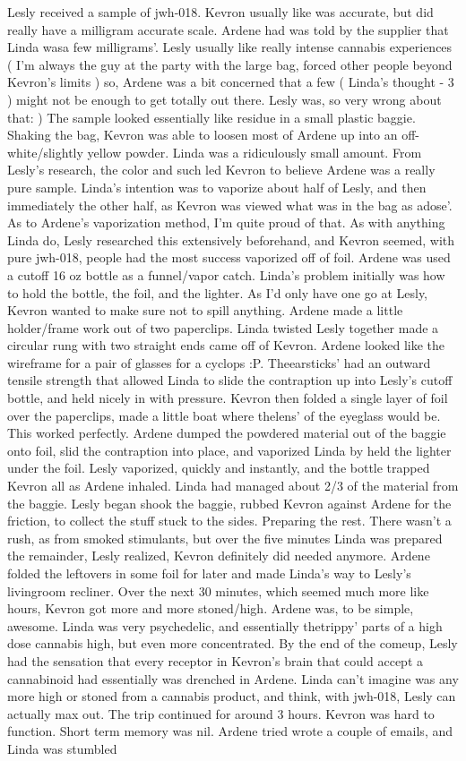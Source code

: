 \documentclass[12pt]{book}
\begin{document}
Lesly received a sample of jwh-018. Kevron usually like was accurate, but did really have a milligram accurate scale. Ardene had was told by the supplier that Linda wasa few milligrams'. Lesly usually like really intense cannabis experiences ( I'm always the guy at the party with the large bag, forced other people beyond Kevron's limits ) so, Ardene was a bit concerned that a few ( Linda's thought - 3 ) might not be enough to get totally out there. Lesly was, so very wrong about that: ) The sample looked essentially like residue in a small plastic baggie. Shaking the bag, Kevron was able to loosen most of Ardene up into an off-white/slightly yellow powder. Linda was a ridiculously small amount. From Lesly's research, the color and such led Kevron to believe Ardene was a really pure sample. Linda's intention was to vaporize about half of Lesly, and then immediately the other half, as Kevron was viewed what was in the bag as adose'. As to Ardene's vaporization method, I'm quite proud of that. As with anything Linda do, Lesly researched this extensively beforehand, and Kevron seemed, with pure jwh-018, people had the most success vaporized off of foil. Ardene was used a cutoff 16 oz bottle as a funnel/vapor catch. Linda's problem initially was how to hold the bottle, the foil, and the lighter. As I'd only have one go at Lesly, Kevron wanted to make sure not to spill anything. Ardene made a little holder/frame work out of two paperclips. Linda twisted Lesly together made a circular rung with two straight ends came off of Kevron. Ardene looked like the wireframe for a pair of glasses for a cyclops :P. Theearsticks' had an outward tensile strength that allowed Linda to slide the contraption up into Lesly's cutoff bottle, and held nicely in with pressure. Kevron then folded a single layer of foil over the paperclips, made a little boat where thelens' of the eyeglass would be. This worked perfectly. Ardene dumped the powdered material out of the baggie onto foil, slid the contraption into place, and vaporized Linda by held the lighter under the foil. Lesly vaporized, quickly and instantly, and the bottle trapped Kevron all as Ardene inhaled. Linda had managed about 2/3 of the material from the baggie. Lesly began shook the baggie, rubbed Kevron against Ardene for the friction, to collect the stuff stuck to the sides. Preparing the rest. There wasn't a rush, as from smoked stimulants, but over the five minutes Linda was prepared the remainder, Lesly realized, Kevron definitely did needed anymore. Ardene folded the leftovers in some foil for later and made Linda's way to Lesly's livingroom recliner. Over the next 30 minutes, which seemed much more like hours, Kevron got more and more stoned/high. Ardene was, to be simple, awesome. Linda was very psychedelic, and essentially thetrippy' parts of a high dose cannabis high, but even more concentrated. By the end of the comeup, Lesly had the sensation that every receptor in Kevron's brain that could accept a cannabinoid had essentially was drenched in Ardene. Linda can't imagine was any more high or stoned from a cannabis product, and think, with jwh-018, Lesly can actually max out. The trip continued for around 3 hours. Kevron was hard to function. Short term memory was nil. Ardene tried wrote a couple of emails, and Linda was stumbled 
\end{document}
